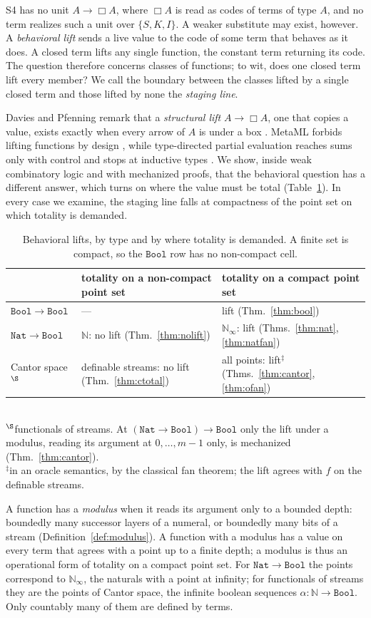 \documentclass[acmsmall,review,screen]{acmart}\def\acmclass{}
\theoremstyle{plain}
\theoremstyle{definition}
\theoremstyle{remark}
\newcommand{\Nat}{\mathtt{Nat}}
\newcommand{\Bool}{\mathtt{Bool}}
\begin{document}
S4 has no unit $A\to\Box A$, where $\Box A$ is read as codes of terms of type $A$,
and no term realizes such a unit over $\{S,K,I\}$.  A weaker
substitute may exist, however.  A \emph{behavioral lift} sends a live value to the code of
some term that behaves as it does.  A closed term lifts any single function, the
constant term returning its code.  The question therefore concerns classes of
functions; to wit, does one closed term lift every member?  We call the boundary
between the classes lifted by a single closed term and those lifted by none the
\emph{staging line}.

Davies and Pfenning remark that a \emph{structural lift} $A \to \Box A$, one that copies
a value, exists exactly when every arrow of $A$ is under a box
\citep[\S5.3, p.~587]{DaviesPfenning2001}.  MetaML forbids lifting functions by design
\citep{TahaSheard2000}, while type-directed partial evaluation reaches sums only
with control and stops at inductive types \citep{Danvy1996}.  We show, inside weak
combinatory logic and with mechanized proofs, that the behavioral question has a
different answer, which turns on where the value must be total (Table~\ref{tab:results}).
In every case we examine, the staging line falls at compactness of the point set
on which totality is demanded.
\begin{table}[tb]\centering\footnotesize
\caption{Behavioral lifts, by type and by where totality is demanded.  A finite set is
compact, so the $\Bool$ row has no non-compact cell.}\label{tab:results}
\begin{tabular}{@{}lll@{}}
\toprule
 & totality on a non-compact point set & totality on a compact point set \\
\midrule
$\Bool\to\Bool$ & --- & lift (Thm.~\ref{thm:bool}) \\
$\Nat\to\Bool$ & $\mathbb{N}$: no lift (Thm.~\ref{thm:nolift}) & $\mathbb{N}_\infty$: lift (Thms.~\ref{thm:nat}, \ref{thm:natfan}) \\
Cantor space$^\S$ & definable streams: no lift (Thm.~\ref{thm:ctotal}) & all points: lift$^\ddagger$ (Thms.~\ref{thm:cantor}, \ref{thm:ofan}) \\
\bottomrule
\end{tabular}\\[2pt]
{\footnotesize $^\S$functionals of streams.  At $(\Nat\to\Bool)\to\Bool$ only the lift
under a modulus, reading its argument at $0,\dots,m-1$ only, is mechanized
(Thm.~\ref{thm:cantor}).\\ $^\ddagger$in an oracle semantics, by the classical fan theorem;
the lift agrees with $f$ on the definable streams.}
\end{table}
A function has a \emph{modulus} when it reads its argument only to a bounded
depth: boundedly many successor layers of a numeral, or boundedly many bits of a
stream (Definition~\ref{def:modulus}).  A function with a modulus has a value on every
term that agrees with a point up to a finite depth; a modulus is thus an operational form
of totality on a compact point set.
For $\Nat\to\Bool$ the points correspond to $\mathbb{N}_\infty$, the naturals with a
point at infinity; for functionals of streams they are the points of Cantor space,
the infinite boolean sequences $\alpha:\mathbb{N}\to\Bool$.  Only countably many of
them are defined by terms.
\end{document}
